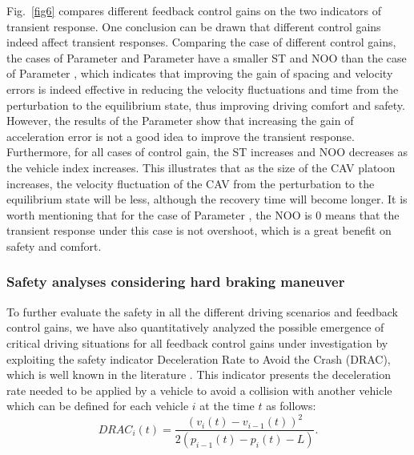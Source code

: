 \documentclass[a4paper]{cas-sc}
\begin{document}
Fig.~\ref{fig6} compares different feedback control gains on the two indicators of transient response. One conclusion can be drawn that different control gains indeed affect transient responses. Comparing the case of different control gains, the cases of Parameter \uppercase\expandafter{} and Parameter \uppercase\expandafter{} have a smaller ST and NOO than the case of Parameter \uppercase\expandafter{}, which indicates that improving the gain of spacing and velocity errors is indeed effective in reducing the velocity fluctuations and time from the perturbation to the equilibrium state, thus improving driving comfort and safety. However, the results of the Parameter \uppercase\expandafter{} show that increasing the gain of acceleration error is not a good idea to improve the transient response. Furthermore, for all cases of control gain, the ST increases and NOO decreases as the vehicle index increases. This illustrates that as the size of the CAV platoon increases, the velocity fluctuation of the CAV from the perturbation to the equilibrium state will be less, although the recovery time will become longer. It is worth mentioning that for the case of Parameter \uppercase\expandafter{}, the NOO is 0 means that the transient response under this case is not overshoot, which is a great benefit on safety and comfort.



\subsubsection{Safety analyses considering hard braking maneuver}
\label{Section 5.2.2}

To further evaluate the safety in all the different driving scenarios and feedback control gains, we have also quantitatively analyzed the possible emergence of critical driving situations for all feedback control gains under investigation by exploiting the safety indicator Deceleration Rate to Avoid the Crash (DRAC), which is well known in the literature \citep{fu2021comparison,fu2021random}. This indicator presents the deceleration rate needed to be applied by a vehicle to avoid a collision with another vehicle which can be defined for each vehicle $i$ at the time $t$ as follows:
\begin{equation}
  DRA{C_i}(t) = \frac{{{{\left( {{v_i}(t) - {v_{i - 1}}(t)} \right)}^2}}}{{2\left( {{p_{i - 1}}(t) - {p_i}(t) - L} \right)}}.
  \label{eq522}
\end{equation}
\end{document}
